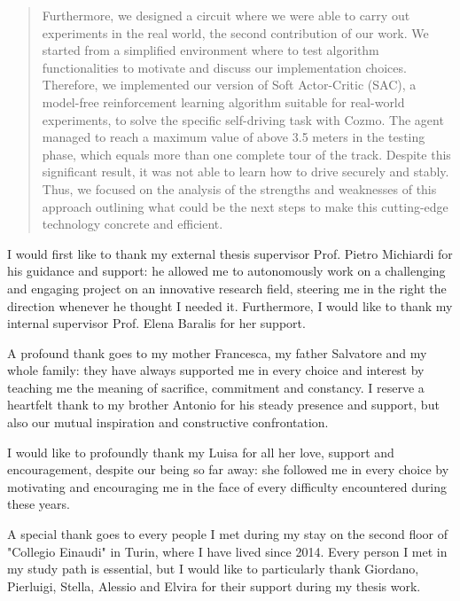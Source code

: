\begin{abstract}
	Furthermore, we designed a circuit where we were able to carry out experiments in the real world, the second contribution of our work.
	We started from a simplified environment where to test algorithm functionalities to motivate and discuss our implementation choices.
	Therefore, we implemented our version of Soft Actor-Critic (SAC), a model-free reinforcement learning algorithm suitable for real-world experiments, to solve the specific self-driving task with Cozmo.
	The agent managed to reach a maximum value of above 3.5 meters in the testing phase, which equals more than one complete tour of the track.
	Despite this significant result, it was not able to learn how to drive securely and stably.
	Thus, we focused on the analysis of the strengths and weaknesses of this approach outlining what could be the next steps to make this cutting-edge technology concrete and efficient.

\end{abstract}



\ringraziamenti

I would first like to thank my external thesis supervisor Prof. Pietro Michiardi for his guidance and support: he allowed me to autonomously work on a challenging and engaging project on an innovative research field, steering me in the right the direction whenever he thought I needed it.
Furthermore, I would like to thank my internal supervisor Prof. Elena Baralis for her support.

A profound thank goes to my mother Francesca, my father Salvatore and my whole family: they have always supported me in every choice and interest by teaching me the meaning of sacrifice, commitment and constancy.
I reserve a heartfelt thank to my brother Antonio for his steady presence and support, but also our mutual inspiration and constructive confrontation.

I would like to profoundly thank my Luisa for all her love, support and encouragement, despite our being so far away: she followed me in every choice by motivating and encouraging me in the face of every difficulty encountered during these years.

A special thank goes to every people I met during my stay on the second floor of "Collegio Einaudi" in Turin, where I have lived since 2014.
Every person I met in my study path is essential, but I would like to particularly thank Giordano, Pierluigi, Stella, Alessio and Elvira for their support during my thesis work.

